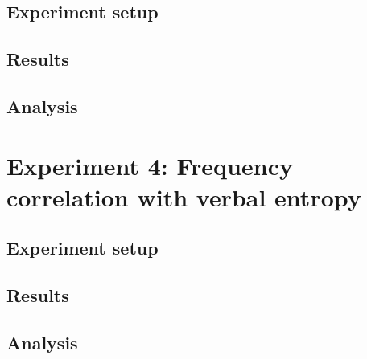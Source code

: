 \subsection{Experiment setup}
\subsection{Results}
\subsection{Analysis}

\section{Experiment 4: Frequency correlation with verbal entropy}
\subsection{Experiment setup}
\subsection{Results}
\subsection{Analysis}
